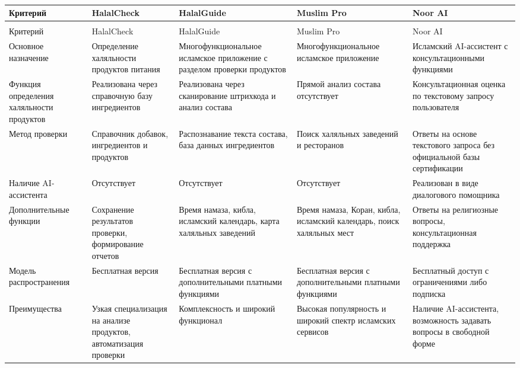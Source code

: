 \begin{longtable}{|>{\small}p{2.8cm}|>{\small}p{2.95cm}|>{\small}p{2.95cm}|>{\small}p{2.95cm}|>{\small}p{2.95cm}|}
\caption{Сравнение существующих решений}\label{tab:comparison}\\
\hline
Критерий & HalalCheck & HalalGuide & Muslim Pro & Noor AI \\
\hline
\endfirsthead
\captionsetup{format=tablenocaption,labelformat=continued}
\caption[]{}\\
\hline
Критерий & HalalCheck & HalalGuide & Muslim Pro & Noor AI \\
\hline
\endhead
\hline
\endfoot
\hline
\endlastfoot
	Основное назначение & Определение халяльности продуктов питания & Много\-функ\-цио\-наль\-ное исламское приложение с разделом проверки продуктов & Много\-функ\-цио\-наль\-ное исламское приложение & Исламский AI-ассистент с кон\-суль\-та\-ци\-он\-ны\-ми функциями \\
\hline
	Функция определения ха\-ляль\-ности продуктов & Реализована через справочную базу ин\-гре\-ди\-ен\-тов & Реализована через сканирование штрихкода и анализ состава & Прямой анализ состава отсутствует & Кон\-суль\-та\-ци\-он\-ная оценка по тексто\-вому запросу пользователя \\
\hline
	Метод проверки & Справочник добавок, ингредиентов и продуктов & Распознавание текста состава, база данных ингредиентов & Поиск халяльных заведений и ресторанов & Ответы на основе текстового запроса без официальной базы сертификации \\
\hline
	Наличие AI-ассистента & Отсутствует & Отсутствует & Отсутствует & Реализован в виде диалогового помощника \\
\hline
	До\-пол\-ни\-тель\-ные функции & Сохранение результатов проверки, формирование отчетов & Время намаза, кибла, исламский календарь, карта халяльных заведений & Время намаза, Коран, кибла, исламский календарь, поиск халяльных мест & Ответы на религиозные вопросы, консультационная поддержка \\
\hline
	Модель распространения & Бесплатная версия & Бесплатная версия с дополнительными платными функциями & Бесплатная версия с дополнительными платными функциями & Бесплатный доступ с ограничениями либо подписка \\
\hline
	Преимущества & Узкая специализация на анализе продуктов, автоматизация проверки & Комплексность и широкий функционал & Высокая популярность и широкий спектр исламских сервисов & Наличие AI-ассистента, возможность задавать вопросы в свободной форме \\

\end{longtable}
